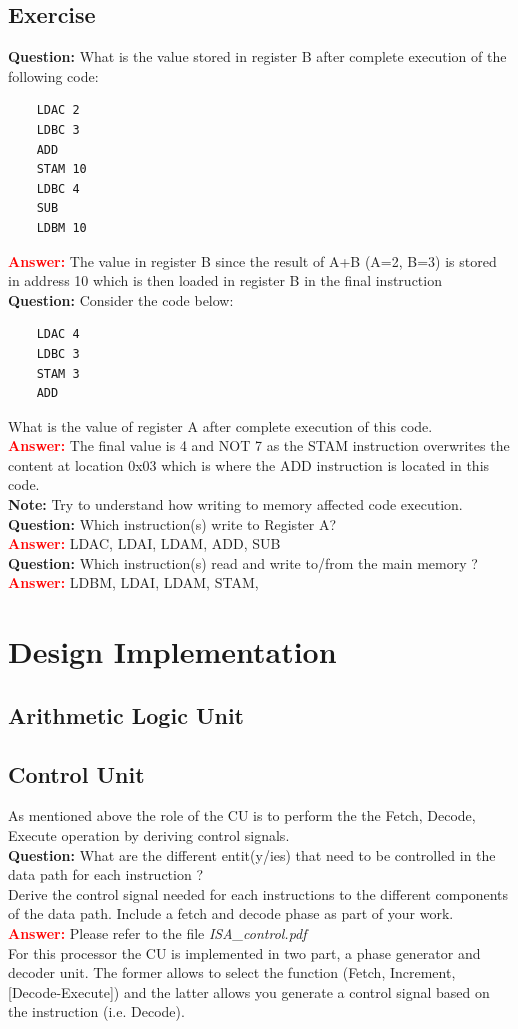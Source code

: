 \documentclass[a4paper, 11pt]{article}
\begin{document}
\subsection{Exercise}

\textbf{Question:} What is the value stored in register B after complete execution of the following code:
\begin{lstlisting}
    LDAC 2
    LDBC 3
    ADD
    STAM 10
    LDBC 4
    SUB
    LDBM 10
\end{lstlisting}
\textcolor{red}{\textbf{Answer:}} The value in register B since the result of A+B (A=2, B=3) is stored in address 10 which is then loaded in register B in the final instruction\\
\textbf{Question:} Consider the code below:
\begin{lstlisting}
    LDAC 4
    LDBC 3
    STAM 3
    ADD
\end{lstlisting}
What is the value of register A after complete execution of this code.\\
\textcolor{red}{\textbf{Answer:}} The final value is 4 and NOT 7 as the STAM instruction overwrites the content at location 0x03 which is where the ADD instruction is located in this code.\\
\textbf{Note:} Try to understand how writing to memory affected code execution.\\
\textbf{Question:} Which instruction(s) write to Register A?\\
\textcolor{red}{\textbf{Answer:}} LDAC, LDAI, LDAM, ADD, SUB\\
\textbf{Question:} Which instruction(s) read and write to/from the main memory ?\\
\textcolor{red}{\textbf{Answer:}} LDBM, LDAI, LDAM, STAM, \\
\section{Design Implementation}
\subsection{Arithmetic Logic Unit}
\subsection{Control Unit}
As mentioned above the role of the CU is to perform the the Fetch, Decode, Execute operation by deriving control signals. \\
\textbf{Question:} What are the different entit(y/ies) that need to be controlled in the data path for each instruction ? \\ 
Derive the control signal needed for each instructions to the different components of the data path. Include a fetch and decode phase as part of your work. \\
\textcolor{red}{\textbf{Answer:}} Please refer to the file \textit{ISA\_control.pdf} \\
For this processor the CU is implemented in two part, a phase generator and decoder unit. The former allows to select the function (Fetch, Increment, [Decode-Execute]) and the latter allows you generate a control signal based on the instruction (i.e. Decode).
\end{document}

